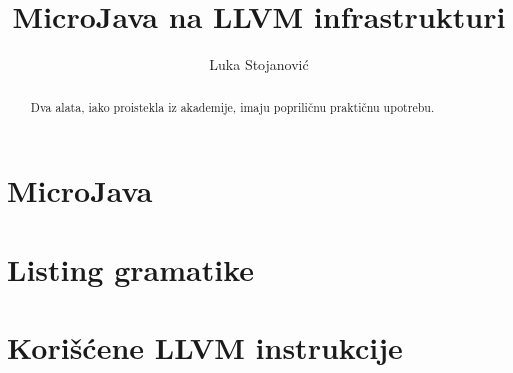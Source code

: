 \documentclass[a4paper,12pt]{report}
\title{MicroJava na LLVM infrastrukturi}
\author{Luka Stojanović}
\begin{document}


\tableofcontents

\begin{abstract}
Dva alata, iako proistekla iz akademije, imaju popriličnu praktičnu upotrebu.
\end{abstract}





\chapter{MicroJava}


\appendix

\chapter{Listing gramatike}

\chapter{Korišćene LLVM instrukcije}


\end{document}
